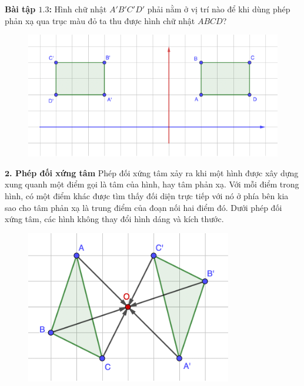 \begin{multicols}{2}
\begin{figure}[H]
		\vspace*{-10pt}
	\end{figure}
	\textbf{\color{toancuabi}Bài tập $\pmb{1.3}$:} Hình chữ nhật $A'B'C'D'$ phải nằm ở vị trí nào để khi dùng phép phản xạ qua trục màu đỏ ta thu được hình chữ nhật $ABCD$?
	\begin{figure}[H]
		\vspace*{-5pt}
		\centering
		\captionsetup{labelformat= empty, justification=centering}
		\includegraphics[width= 1\linewidth]{Picture8}
		\vspace*{-10pt}
	\end{figure}
	\textbf{\color{toancuabi}$\pmb2$. Phép đối xứng tâm}
	\vskip 0.1cm
	Phép đối xứng tâm xảy ra khi một hình được xây dựng xung quanh một điểm gọi là tâm của hình, hay tâm phản xạ. Với mỗi điểm trong hình, có một điểm khác được tìm thấy đối diện trực tiếp với nó ở phía bên kia sao cho tâm phản xạ là trung điểm của đoạn nối hai điểm đó. Dưới phép đối xứng tâm, các hình không thay đổi hình dáng và kích thước. 
	\begin{figure}[H]
		\vspace*{-5pt}
		\centering
		\captionsetup{labelformat= empty, justification=centering}
		\includegraphics[width= 1\linewidth]{Picture9}

\end{figure}
\end{multicols}
